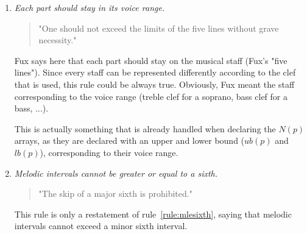 \begin{enumerate}[wide, label=\bfseries 1.M\arabic*]
    \item\label{rule:each-part-should-stay-in-its-voice-range}  \textit{Each part should stay in its voice range.}

    \begin{quotation}
    "One should not exceed the limits of the five lines without grave necessity."
    \textcite[p.79]{GaPEng}
    \end{quotation}

    Fux says here that each part should stay on the musical staff (Fux's "five lines"). Since every staff can be represented differently according to the clef that is used, this rule could be always true. Obviously, Fux meant the staff corresponding to the voice range (treble clef for a soprano, bass clef for a bass, ...). 
    
    This is actually something that is already handled when declaring the $N(p)$ arrays, as they are declared with an upper and lower bound ($ub(p)$ and $lb(p)$), corresponding to their voice range.

    \item\label{rule:melodic-intervals-cannot-be-greater-or-equal-to-a-sixth}  \textit{Melodic intervals cannot be greater or equal to a sixth.}

    \begin{quotation}
    "The skip of a major sixth is prohibited."
    \textcite[p.79]{GaPEng}
    \end{quotation}
    
    This rule is only a restatement of rule~\ref{rule:mlesixth}, saying that melodic intervals cannot exceed a minor sixth interval.
\end{enumerate}

